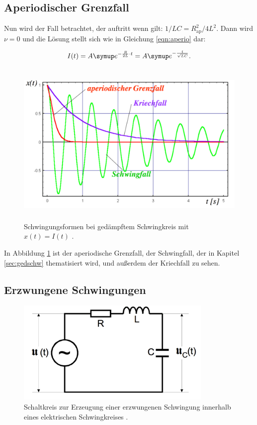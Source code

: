 \subsection{Aperiodischer Grenzfall}

Nun wird der Fall betrachtet, der auftritt wenn gilt:
$1/LC = R_{\text{ap}}^2/4L^2$. Dann wird $\nu = 0$ und die Lösung stellt
sich wie in Gleichung \eqref{eqn:aperio} dar:

\begin{equation}
  I(t) = A \g{e}^{-\frac{R}{2L}\cdot t} = A \g{e}^{-\frac{t}{\sqrt{LC}}}.
  \label{eqn:aperio}
\end{equation}

\begin{figure}[h]
  \centering
  \includegraphics[height = 8cm]{aperio.pdf}
  \caption{Schwingungsformen bei gedämpftem Schwingkreis mit $x(t) = I(t)$ \cite{weis}.}
  \label{fig:aperio}
\end{figure}

In Abbildung \ref{fig:aperio} ist der aperiodische Grenzfall, der
Schwingfall, der in Kapitel \ref{sec:gedschw} thematisiert wird, und
außerdem der Kriechfall zu sehen.

\subsection{Erzwungene Schwingungen}

\begin{figure}[h]
  \centering
  \includegraphics[height = 5cm]{erzwschw.pdf}
  \caption{Schaltkreis zur Erzeugung einer erzwungenen Schwingung innerhalb
  eines elektrischen Schwingkreises \cite{anleitung}.}
  \label{fig:erzwschw}
\end{figure}

